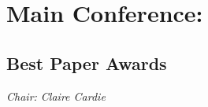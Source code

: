 \chapter{Main Conference: \daydate}
\thispagestyle{emptyheader}

\newpage

\newpage



\clearpage
\newpage




\clearpage
\section{Best Paper Awards}

\emph{Chair: Claire Cardie}
\par




